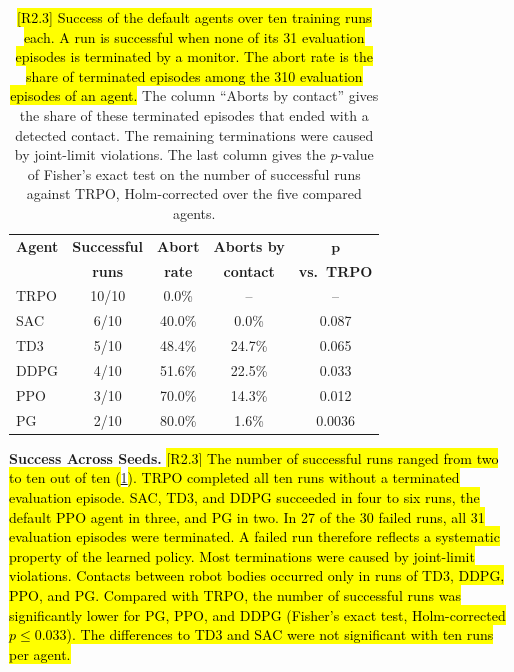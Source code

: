 \documentclass{ieeeaccess}
\newcommand{\hlone}[1]{{\sethlcolor{rone}\hl{#1}}}
\begin{document}
\begin{table}[!t]
\centering
\caption{\hlone{[R2.3] Success of the default agents over ten training runs each. A run is successful when none of its
31 evaluation episodes is terminated by a monitor. The abort rate is the share of terminated episodes among
the 310 evaluation episodes of an agent.} The column ``Aborts by contact'' gives the
share of these terminated episodes that ended with a detected contact. The remaining terminations were
caused by joint-limit violations. The last column gives the $p$-value of Fisher's exact test on the
number of successful runs against TRPO, Holm-corrected over the five compared agents.}
\label{tab:robustness_seeds}
\renewcommand{\arraystretch}{1.2}
\begin{tabular}{lcccc}
\toprule
\textbf{Agent} & \textbf{Successful} & \textbf{Abort} & \textbf{Aborts by} & $\boldsymbol{p}$ \\
 & \textbf{runs} & \textbf{rate} & \textbf{contact} & \textbf{vs.\ TRPO} \\
\midrule
TRPO & 10/10 & 0.0\% & -- & -- \\
SAC & 6/10 & 40.0\% & 0.0\% & 0.087 \\
TD3 & 5/10 & 48.4\% & 24.7\% & 0.065 \\
DDPG & 4/10 & 51.6\% & 22.5\% & 0.033 \\
PPO & 3/10 & 70.0\% & 14.3\% & 0.012 \\
PG & 2/10 & 80.0\% & 1.6\% & 0.0036 \\
\bottomrule
\end{tabular}
\end{table}

\textbf{Success Across Seeds.} \hlone{[R2.3] The number of successful runs ranged from two to ten out of ten
(}\cref{tab:robustness_seeds}\hlone{). TRPO completed all ten runs without a terminated evaluation episode.
SAC, TD3, and DDPG succeeded in four to six runs, the default PPO agent in three, and PG in two. In
27 of the 30 failed runs, all 31 evaluation episodes were terminated. A failed run therefore reflects a
systematic property of the learned policy. Most terminations were caused by joint-limit violations.
Contacts between robot bodies occurred only in runs of TD3, DDPG, PPO, and PG. Compared with TRPO, the
number of successful runs was significantly lower for PG, PPO, and DDPG (Fisher's exact test,
Holm-corrected $p \le 0.033$). The differences to TD3 and SAC were not significant with ten runs per
agent.}
\end{document}

